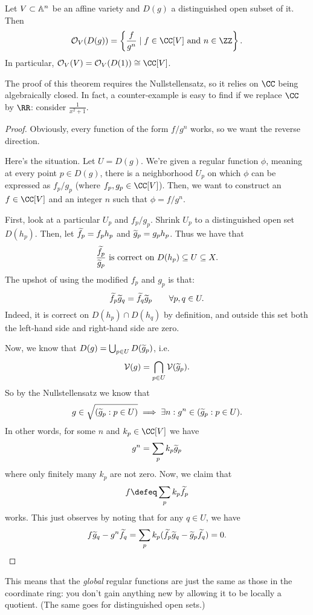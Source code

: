 \begin{theorem}
	\label{thm:reg_func_distinguish_open}
	Let $V \subset \mathbb A^n$ be an affine variety
	and $D(g)$ a distinguished open subset of it.
	Then
	\[
		\OO_V( D(g) )
		=
		\left\{ \frac{f}{g^n} \mid f \in \CC[V] \text{ and } n \in \ZZ \right\}.
	\]
	In particular, $\OO_V(V) = \OO_V(D(1)) \cong \CC[V]$.
\end{theorem}
The proof of this theorem requires the Nullstellensatz,
so it relies on $\CC$ being algebraically closed.
In fact, a counter-example is easy to find if we replace $\CC$ by $\RR$:
consider $\frac{1}{x^2+1}$.
\begin{proof}
	Obviously, every function of the form $f/g^n$ works,
	so we want the reverse direction.

	Here's the situation.
	Let $U = D(g)$.
	We're given a regular function $\phi$, meaning at every point $p \in D(g)$,
	there is a neighborhood $U_p$ on which $\phi$ can be expressed
	as $f_p / g_p$ (where $f_p, g_p \in \CC[V]$).
	Then, we want to construct an $f \in \CC[V]$ and an integer $n$
	such that $\phi = f/g^n$.

	First, look at a particular $U_p$ and $f_p / g_p$.
	Shrink $U_p$ to a distinguished open set $D(h_p)$.
	Then, let $\widetilde f_p = f_p h_p$ and $\widetilde g_p = g_p h_p$.
	Thus we have that
	\[ \frac{\widetilde f_p}{\widetilde g_p} \text{ is correct on }
		D(h_p) \subseteq U \subseteq X. \]
	The upshot of using the modified $f_p$ and $g_p$ is that:
	\[ \widetilde f_p \widetilde g_q = \widetilde f_q \widetilde g_p \qquad \forall p,q \in U. \]
	Indeed, it is correct on $D(h_p) \cap D(h_q)$ by definition,
	and outside this set both the left-hand side and right-hand side are zero.

	Now, we know that $D(g) = \bigcup_{p \in U} D(\widetilde g_p)$, i.e.\
	\[ \mathcal V(g) = \bigcap_{p \in U} \mathcal V(\widetilde g_p). \]
	So by the Nullstellensatz we know that
	\[ g \in \sqrt{(\widetilde g_p : p \in U)}
		\implies \exists n : g^n \in (\widetilde g_p : p \in U). \]
	In other words, for some $n$ and $k_p \in \CC[V]$ we have
	\[ g^n = \sum_p k_p \widetilde g_p \]
	where only finitely many $k_p$ are not zero.
	Now, we claim that
	\[ f \defeq \sum_p k_p \wt f_p \]
	works.
	This just observes by noting that for any $q \in U$, we have
	\[
		f \widetilde g_q - g^n \widetilde f_q
		= \sum_p k_p(\widetilde f_p \widetilde g_q - \widetilde g_p \widetilde f_q)
		= 0. \qedhere
	\]
\end{proof}
This means that the \emph{global} regular functions
are just the same as those in the coordinate ring:
you don't gain anything new by allowing it to be locally a quotient.
(The same goes for distinguished open sets.)

